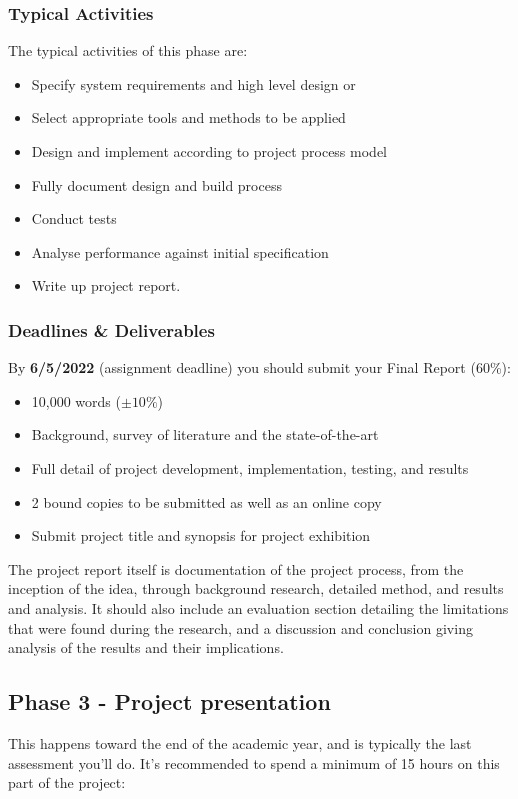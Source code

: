 \subsubsection{Typical Activities}

The typical activities of this phase are: 

\begin{itemize}
    \item Specify system requirements and high level design or
    \item Select appropriate tools and methods to be applied
    \item Design and implement according to project process model
    \item Fully document design and build process
    \item Conduct tests
    \item Analyse performance against initial specification
    \item Write up project report.
\end{itemize}

\subsubsection{Deadlines \& Deliverables}

By \textbf{6/5/2022} (assignment deadline) you should submit your Final Report (60\%):

\begin{itemize}
    \item 10,000 words ($\pm 10\%$)
    \item Background, survey of literature and the state-of-the-art
    \item Full detail of project development, implementation, testing, and results
    \item 2 bound copies to be submitted as well as an online copy
    \item Submit project title and synopsis for project exhibition
\end{itemize}

The project report itself is documentation of the project process, from the inception of the idea, through background research, detailed method, and results and analysis. It should also include an evaluation section detailing the limitations that were found during the research, and a discussion and conclusion giving analysis of the results and their implications. 

\subsection{Phase 3 - Project presentation}
This happens toward the end of the academic year, and is typically the last assessment you'll do. It's recommended to spend a minimum of 15 hours on this part of the project:

